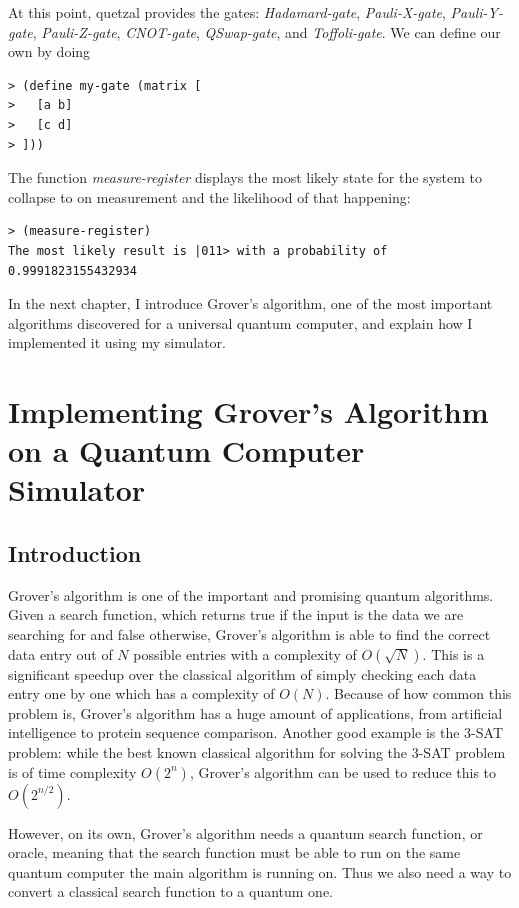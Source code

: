 \documentclass[11pt]{report}
\newcommand{\?}{\stackrel{?}{=}}
\begin{document}
At this point, quetzal provides the gates: \textit{Hadamard-gate}, \textit{Pauli-X-gate}, \textit{Pauli-Y-gate}, \textit{Pauli-Z-gate}, \textit{CNOT-gate}, \textit{QSwap-gate}, and \textit{Toffoli-gate}. We can define our own by doing

\begin{verbatim}
> (define my-gate (matrix [
> 	[a b]
> 	[c d]
> ]))
\end{verbatim}

The function \textit{measure-register} displays the most likely state for the system to collapse to on measurement and the likelihood of that happening:

\begin{verbatim}
> (measure-register)
The most likely result is |011> with a probability of 0.9991823155432934
\end{verbatim}

In the next chapter, I introduce Grover's algorithm, one of the most important algorithms discovered for a universal quantum computer, and explain how I implemented it using my simulator.

\chapter{Implementing Grover's Algorithm on a Quantum Computer Simulator}

\section{Introduction}

Grover's algorithm is one of the important and promising quantum algorithms. Given a search function, which returns true if the input is the data we are searching for and false otherwise, Grover's algorithm is able to find the correct data entry out of $N$ possible entries with a complexity of $O(\sqrt{N})$. This is a significant speedup over the classical algorithm of simply checking each data entry one by one which has a complexity of $O(N)$. Because of how common this problem is, Grover's algorithm has a huge amount of applications, from artificial intelligence to protein sequence comparison. Another good example is the 3-SAT problem: while the best known classical algorithm for solving the 3-SAT problem is of time complexity $O(2^{n})$, Grover's algorithm can be used to reduce this to $O(2^{n/2})$.

However, on its own, Grover's algorithm needs a quantum search function, or oracle, meaning that the search function must be able to run on the same quantum computer the main algorithm is running on. Thus we also need a way to convert a classical search function to a quantum one.
\end{document}
